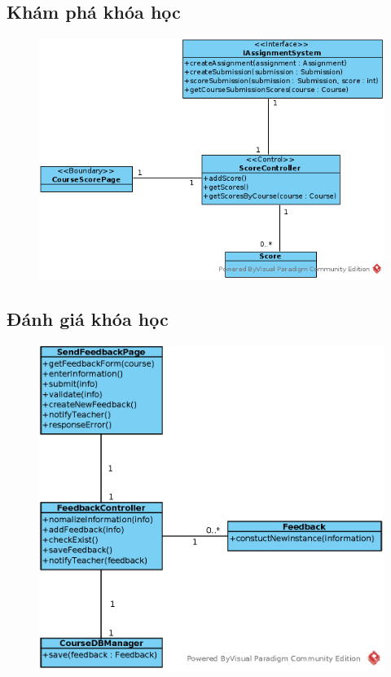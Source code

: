 \documentclass[./../main_file.tex]{subfiles}
\begin{document}
\subsection{Khám phá khóa học}
\begin{figure}[H]
	\centering
	\includegraphics[width=\linewidth]{./images/define_operations/ucd_op_ss_check_course_progress.png}
\end{figure}
\subsection{Đánh giá khóa học}
\begin{figure}[H]
	\centering
	\includegraphics[width=\linewidth]{./images/define_operations/ucd_method_feedbackcourse.eps}
\end{figure}
\end{document}
